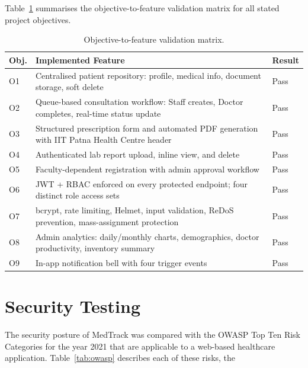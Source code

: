 Table~\ref{tab:features} summarises the objective-to-feature validation
matrix for all stated project objectives.

\begin{table}[htbp]
  \centering
  \caption{Objective-to-feature validation matrix.}
  \label{tab:features}
  \begin{tabularx}{\textwidth}{lXl}
    \hline
    \textbf{Obj.} & \textbf{Implemented Feature} & \textbf{Result} \\
    \hline
    O1 & Centralised patient repository: profile, medical info,
         document storage, soft delete
       & Pass \\
    O2 & Queue-based consultation workflow: Staff creates, Doctor
         completes, real-time status update
       & Pass \\
    O3 & Structured prescription form and automated PDF generation
         with IIT Patna Health Centre header
       & Pass \\
    O4 & Authenticated lab report upload, inline view, and delete
       & Pass \\
    O5 & Faculty-dependent registration with admin approval workflow
       & Pass \\
    O6 & JWT + RBAC enforced on every protected endpoint; four
         distinct role access sets
       & Pass \\
    O7 & bcrypt, rate limiting, Helmet, input validation, ReDoS
         prevention, mass-assignment protection
       & Pass \\
    O8 & Admin analytics: daily/monthly charts, demographics, doctor
         productivity, inventory summary
       & Pass \\
    O9 & In-app notification bell with four trigger events
       & Pass \\
    \hline
  \end{tabularx}
\end{table}

\section{Security Testing}

The security posture of MedTrack was compared with the
OWASP Top Ten Risk Categories for the year 2021 \cite{OWASP2021}
that are applicable to a web-based healthcare application.
Table~\ref{tab:owasp} describes each of these risks, the


